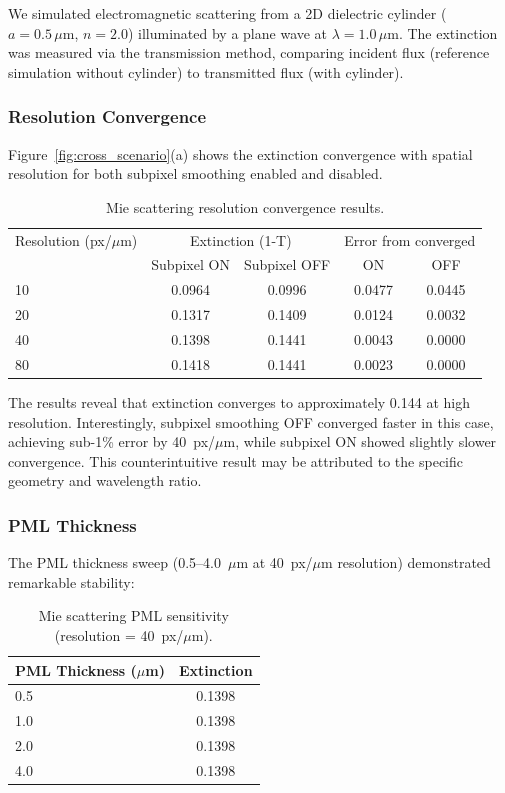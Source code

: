 \documentclass[12pt, a4paper]{article}
\begin{document}
We simulated electromagnetic scattering from a 2D dielectric cylinder ($a = 0.5\,\mu\text{m}$, $n = 2.0$) illuminated by a plane wave at $\lambda = 1.0\,\mu\text{m}$. The extinction was measured via the transmission method, comparing incident flux (reference simulation without cylinder) to transmitted flux (with cylinder).

\subsubsection{Resolution Convergence}

Figure~\ref{fig:cross_scenario}(a) shows the extinction convergence with spatial resolution for both subpixel smoothing enabled and disabled.

\begin{table}[H]
\centering
\caption{Mie scattering resolution convergence results.}
\label{tab:mie_resolution}
\begin{tabular}{lcccc}
\toprule
Resolution (px/$\mu$m) & \multicolumn{2}{c}{Extinction (1-T)} & \multicolumn{2}{c}{Error from converged} \\
 & Subpixel ON & Subpixel OFF & ON & OFF \\
\midrule
10 & 0.0964 & 0.0996 & 0.0477 & 0.0445 \\
20 & 0.1317 & 0.1409 & 0.0124 & 0.0032 \\
40 & 0.1398 & 0.1441 & 0.0043 & 0.0000 \\
80 & 0.1418 & 0.1441 & 0.0023 & 0.0000 \\
\bottomrule
\end{tabular}
\end{table}

The results reveal that extinction converges to approximately 0.144 at high resolution. Interestingly, subpixel smoothing OFF converged faster in this case, achieving sub-1\% error by 40~px/$\mu$m, while subpixel ON showed slightly slower convergence. This counterintuitive result may be attributed to the specific geometry and wavelength ratio.

\subsubsection{PML Thickness}

The PML thickness sweep (0.5--4.0~$\mu$m at 40~px/$\mu$m resolution) demonstrated remarkable stability:

\begin{table}[H]
\centering
\caption{Mie scattering PML sensitivity (resolution = 40~px/$\mu$m).}
\label{tab:mie_pml}
\begin{tabular}{lc}
\toprule
PML Thickness ($\mu$m) & Extinction \\
\midrule
0.5 & 0.1398 \\
1.0 & 0.1398 \\
2.0 & 0.1398 \\
4.0 & 0.1398 \\
\bottomrule
\end{tabular}
\end{table}
\end{document}
